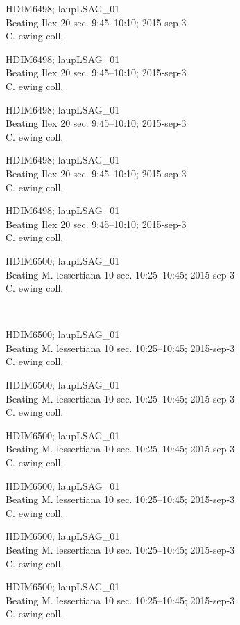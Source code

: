 \documentclass[2pt]{extarticle}
\begin{document}
\noindent
\parbox{0.16\textwidth}{\tiny \raggedright \rule[-0.3\baselineskip]{0pt}{10pt}HDIM6498; laupLSAG\_01\\ Beating Ilex 20 sec. 9:45--10:10; 2015-sep-3\\ C. ewing coll.}
\parbox{0.16\textwidth}{\tiny \raggedright \rule[-0.3\baselineskip]{0pt}{10pt}HDIM6498; laupLSAG\_01\\ Beating Ilex 20 sec. 9:45--10:10; 2015-sep-3\\ C. ewing coll.}
\parbox{0.16\textwidth}{\tiny \raggedright \rule[-0.3\baselineskip]{0pt}{10pt}HDIM6498; laupLSAG\_01\\ Beating Ilex 20 sec. 9:45--10:10; 2015-sep-3\\ C. ewing coll.}
\parbox{0.16\textwidth}{\tiny \raggedright \rule[-0.3\baselineskip]{0pt}{10pt}HDIM6498; laupLSAG\_01\\ Beating Ilex 20 sec. 9:45--10:10; 2015-sep-3\\ C. ewing coll.}
\parbox{0.16\textwidth}{\tiny \raggedright \rule[-0.3\baselineskip]{0pt}{10pt}HDIM6498; laupLSAG\_01\\ Beating Ilex 20 sec. 9:45--10:10; 2015-sep-3\\ C. ewing coll.}
\parbox{0.16\textwidth}{\tiny \raggedright \rule[-0.3\baselineskip]{0pt}{10pt}HDIM6500; laupLSAG\_01\\ Beating M. lessertiana 10 sec. 10:25--10:45; 2015-sep-3\\ C. ewing coll.} \\ 
\vspace{0.001in} 

\noindent
\parbox{0.16\textwidth}{\tiny \raggedright \rule[-0.3\baselineskip]{0pt}{10pt}HDIM6500; laupLSAG\_01\\ Beating M. lessertiana 10 sec. 10:25--10:45; 2015-sep-3\\ C. ewing coll.}
\parbox{0.16\textwidth}{\tiny \raggedright \rule[-0.3\baselineskip]{0pt}{10pt}HDIM6500; laupLSAG\_01\\ Beating M. lessertiana 10 sec. 10:25--10:45; 2015-sep-3\\ C. ewing coll.}
\parbox{0.16\textwidth}{\tiny \raggedright \rule[-0.3\baselineskip]{0pt}{10pt}HDIM6500; laupLSAG\_01\\ Beating M. lessertiana 10 sec. 10:25--10:45; 2015-sep-3\\ C. ewing coll.}
\parbox{0.16\textwidth}{\tiny \raggedright \rule[-0.3\baselineskip]{0pt}{10pt}HDIM6500; laupLSAG\_01\\ Beating M. lessertiana 10 sec. 10:25--10:45; 2015-sep-3\\ C. ewing coll.}
\parbox{0.16\textwidth}{\tiny \raggedright \rule[-0.3\baselineskip]{0pt}{10pt}HDIM6500; laupLSAG\_01\\ Beating M. lessertiana 10 sec. 10:25--10:45; 2015-sep-3\\ C. ewing coll.}
\parbox{0.16\textwidth}{\tiny \raggedright \rule[-0.3\baselineskip]{0pt}{10pt}HDIM6500; laupLSAG\_01\\ Beating M. lessertiana 10 sec. 10:25--10:45; 2015-sep-3\\ C. ewing coll.} \\ 
\vspace{0.001in} 
\end{document}
